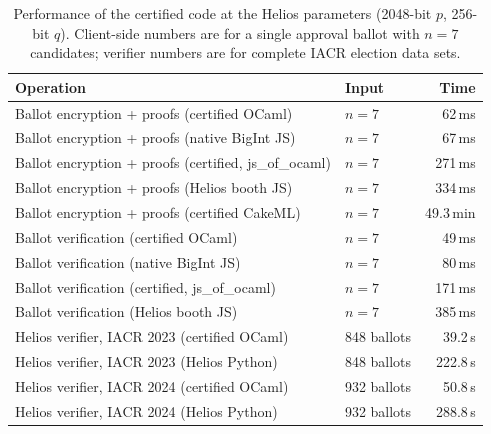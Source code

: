\begin{table}
  \caption{Performance of the certified code at the Helios parameters (2048-bit $p$, 256-bit $q$). Client-side numbers are for a single approval ballot with $n = 7$ candidates; verifier numbers are for complete IACR election data sets.}
  \label{tab:perf}
  \footnotesize
  \begin{tabularx}{\columnwidth}{@{}>{\raggedright\arraybackslash}Xlr@{}}
    \toprule
    Operation & Input & Time\\
    \midrule
    Ballot encryption + proofs (certified OCaml) & $n = 7$ & 62\,ms\\
    Ballot encryption + proofs (native BigInt JS) & $n = 7$ & 67\,ms\\
    Ballot encryption + proofs (certified, js\_of\_ocaml) & $n = 7$ & 271\,ms\\
    Ballot encryption + proofs (Helios booth JS) & $n = 7$ & 334\,ms\\
    Ballot encryption + proofs (certified CakeML) & $n = 7$ & 49.3\,min\\
    Ballot verification (certified OCaml) & $n = 7$ & 49\,ms\\
    Ballot verification (native BigInt JS) & $n = 7$ & 80\,ms\\
    Ballot verification (certified, js\_of\_ocaml) & $n = 7$ & 171\,ms\\
    Ballot verification (Helios booth JS) & $n = 7$ & 385\,ms\\
    Helios verifier, IACR 2023 (certified OCaml) & 848 ballots & 39.2\,s\\
    Helios verifier, IACR 2023 (Helios Python) & 848 ballots & 222.8\,s\\
    Helios verifier, IACR 2024 (certified OCaml) & 932 ballots & 50.8\,s\\
    Helios verifier, IACR 2024 (Helios Python) & 932 ballots & 288.8\,s\\
    \bottomrule
  \end{tabularx}
\end{table}


